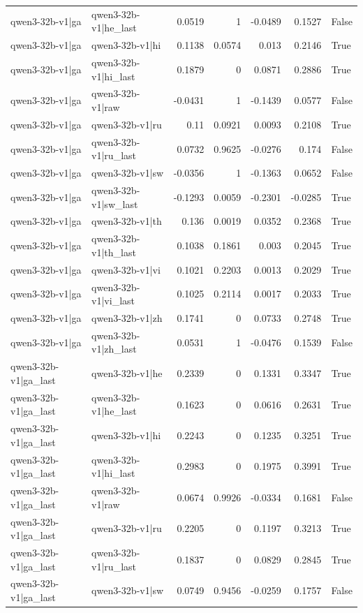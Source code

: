 \begin{table}
\begin{tabular}{l l r r r r l}
qwen3-32b-v1|ga & qwen3-32b-v1|he_last & 0.0519 & 1 & -0.0489 & 0.1527 & False \\
qwen3-32b-v1|ga & qwen3-32b-v1|hi & 0.1138 & 0.0574 & 0.013 & 0.2146 & True \\
qwen3-32b-v1|ga & qwen3-32b-v1|hi_last & 0.1879 & 0 & 0.0871 & 0.2886 & True \\
qwen3-32b-v1|ga & qwen3-32b-v1|raw & -0.0431 & 1 & -0.1439 & 0.0577 & False \\
qwen3-32b-v1|ga & qwen3-32b-v1|ru & 0.11 & 0.0921 & 0.0093 & 0.2108 & True \\
qwen3-32b-v1|ga & qwen3-32b-v1|ru_last & 0.0732 & 0.9625 & -0.0276 & 0.174 & False \\
qwen3-32b-v1|ga & qwen3-32b-v1|sw & -0.0356 & 1 & -0.1363 & 0.0652 & False \\
qwen3-32b-v1|ga & qwen3-32b-v1|sw_last & -0.1293 & 0.0059 & -0.2301 & -0.0285 & True \\
qwen3-32b-v1|ga & qwen3-32b-v1|th & 0.136 & 0.0019 & 0.0352 & 0.2368 & True \\
qwen3-32b-v1|ga & qwen3-32b-v1|th_last & 0.1038 & 0.1861 & 0.003 & 0.2045 & True \\
qwen3-32b-v1|ga & qwen3-32b-v1|vi & 0.1021 & 0.2203 & 0.0013 & 0.2029 & True \\
qwen3-32b-v1|ga & qwen3-32b-v1|vi_last & 0.1025 & 0.2114 & 0.0017 & 0.2033 & True \\
qwen3-32b-v1|ga & qwen3-32b-v1|zh & 0.1741 & 0 & 0.0733 & 0.2748 & True \\
qwen3-32b-v1|ga & qwen3-32b-v1|zh_last & 0.0531 & 1 & -0.0476 & 0.1539 & False \\
qwen3-32b-v1|ga_last & qwen3-32b-v1|he & 0.2339 & 0 & 0.1331 & 0.3347 & True \\
qwen3-32b-v1|ga_last & qwen3-32b-v1|he_last & 0.1623 & 0 & 0.0616 & 0.2631 & True \\
qwen3-32b-v1|ga_last & qwen3-32b-v1|hi & 0.2243 & 0 & 0.1235 & 0.3251 & True \\
qwen3-32b-v1|ga_last & qwen3-32b-v1|hi_last & 0.2983 & 0 & 0.1975 & 0.3991 & True \\
qwen3-32b-v1|ga_last & qwen3-32b-v1|raw & 0.0674 & 0.9926 & -0.0334 & 0.1681 & False \\
qwen3-32b-v1|ga_last & qwen3-32b-v1|ru & 0.2205 & 0 & 0.1197 & 0.3213 & True \\
qwen3-32b-v1|ga_last & qwen3-32b-v1|ru_last & 0.1837 & 0 & 0.0829 & 0.2845 & True \\
qwen3-32b-v1|ga_last & qwen3-32b-v1|sw & 0.0749 & 0.9456 & -0.0259 & 0.1757 & False \\

\end{tabular}
\end{table}
